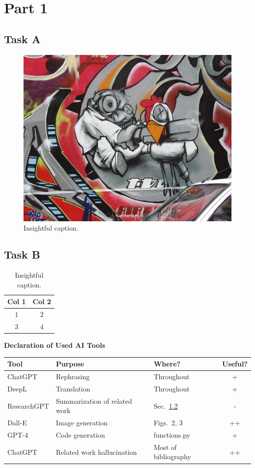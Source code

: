 \documentclass{article}
\begin{document}
\section{Part 1}
\subsection{Task A}

\lipsum[1-3]

\begin{figure}[H]
    \centering
    \includegraphics[width=0.5\linewidth]{graf.png}
    \caption{Insightful caption.}
    \label{fig:placeholder}
\end{figure}

\subsection{Task B}
\label{sec:task-b}

\lipsum[1-3]

\begin{table}[H]
    \centering
    \begin{tabular}{c|c}
        \toprule
        Col 1 & Col 2 \\
        \midrule
        $1$ & $2$ \\
        \midrule
        $3 $& $4$ \\
        \bottomrule
    \end{tabular}
    \caption{Insightful caption.}
    \label{tab:placeholder}
\end{table}

\clearpage

\begin{center}
  \textbf{Declaration of Used AI Tools} \\[.3em]
  \begin{tabularx}{\textwidth}{lXlc}
    \toprule
    Tool & Purpose & Where? & Useful? \\
    \midrule
    ChatGPT & Rephrasing & Throughout & + \\
    DeepL & Translation & Throughout & + \\
    ResearchGPT & Summarization of related work & Sec.~\ref{sec:task-b} & - \\
    Dall-E & Image generation & Figs.~2, 3 & ++ \\
    GPT-4 & Code generation & functions.py & + \\
    ChatGPT & Related work hallucination & Most of bibliography & ++ \\
    \bottomrule
  \end{tabularx}
\end{center}
\end{document}

